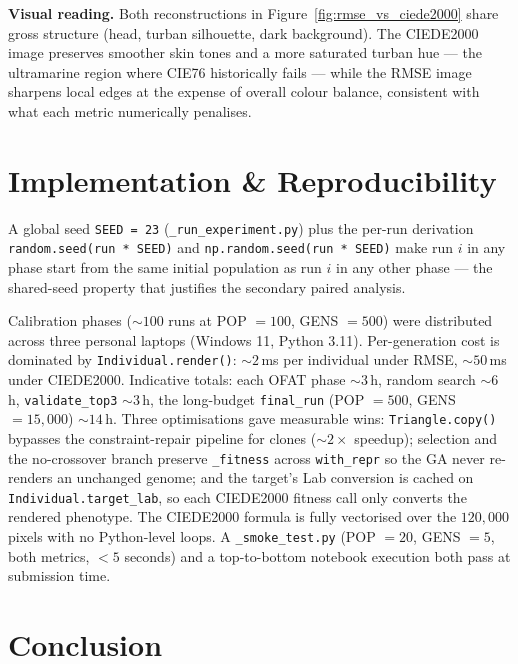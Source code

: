 \documentclass[11pt,a4paper]{article}
\begin{document}
\textbf{Visual reading.} Both reconstructions in
Figure~\ref{fig:rmse_vs_ciede2000} share gross structure (head,
turban silhouette, dark background). The CIEDE2000 image preserves
smoother skin tones and a more saturated turban hue --- the
ultramarine region where CIE76 historically fails --- while the RMSE
image sharpens local edges at the expense of overall colour balance,
consistent with what each metric numerically penalises.

\section{Implementation \& Reproducibility}

A global seed \texttt{SEED = 23} (\texttt{\_run\_experiment.py}) plus
the per-run derivation \texttt{random.seed(run * SEED)} and
\texttt{np.random.seed(run * SEED)} make run $i$ in any phase start
from the same initial population as run $i$ in any other phase ---
the shared-seed property that justifies the secondary paired
analysis.

Calibration phases ($\sim\!100$ runs at POP $= 100$, GENS $= 500$)
were distributed across three personal laptops (Windows 11, Python
3.11). Per-generation cost is dominated by \texttt{Individual.render()}:
$\sim\!2$\,ms per individual under RMSE, $\sim\!50$\,ms under CIEDE2000.
Indicative totals: each OFAT phase $\sim\!3$\,h, random search
$\sim\!6$\,h, \texttt{validate\_top3} $\sim\!3$\,h, the long-budget
\texttt{final\_run} (POP $= 500$, GENS $= 15{,}000$) $\sim\!14$\,h.
Three optimisations gave measurable wins: \texttt{Triangle.copy()}
bypasses the constraint-repair pipeline for clones ($\sim\!2\times$
speedup); selection and the no-crossover branch preserve
\texttt{\_fitness} across \texttt{with\_repr} so the GA never
re-renders an unchanged genome; and the target's Lab conversion is
cached on \texttt{Individual.target\_lab}, so each CIEDE2000 fitness
call only converts the rendered phenotype. The CIEDE2000 formula is
fully vectorised over the $120{,}000$ pixels with no Python-level loops.
A \texttt{\_smoke\_test.py} (POP $= 20$, GENS $= 5$, both metrics, $<\!5$
seconds) and a top-to-bottom notebook execution both pass at submission
time.

\section{Conclusion}
\end{document}
